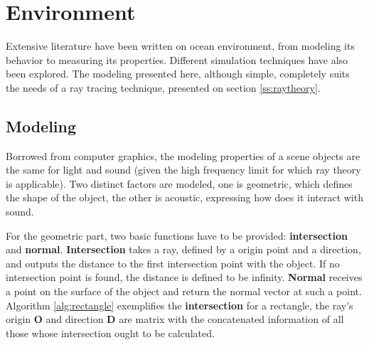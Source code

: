 \section{Environment}

Extensive literature have been written on ocean environment, from modeling its
behavior to measuring its properties. Different simulation techniques have also
been explored\cite{Etter2013}. The modeling presented here, although simple,
completely suits the needs of a ray tracing technique, presented on section
\ref{ss:raytheory}.

\subsection{Modeling}
\label{ss:modeling}
Borrowed from computer graphics, the modeling properties of a scene objects
are the same for light and sound (given the high frequency limit for which ray
theory is applicable). Two distinct factors are modeled, one is geometric,
which defines the shape of the object, the other is acoustic, expressing how
does it interact with sound.

For the geometric part, two basic functions have to be provided: \textbf{intersection}
and \textbf{normal}. \textbf{Intersection} takes a ray, defined by a origin point and a
direction, and outputs the distance to the first intersection point with the
object. If no intersection point is found, the distance is defined to be
infinity. \textbf{Normal} receives a point on the surface of the object and
return the normal vector at such a point. Algorithm \ref{alg:rectangle}
exemplifies the \textbf{intersection} for a rectangle, the ray's origin
$\mathbf{O}$ and direction $\mathbf{D}$ are matrix with the concatenated
information of all those whose intersection ought to be calculated.

